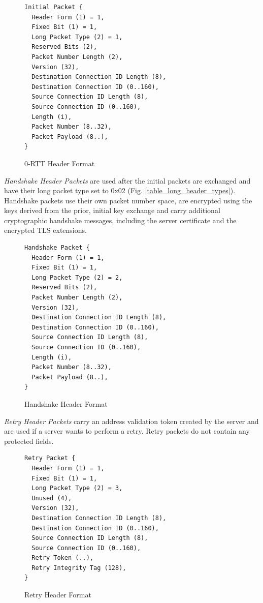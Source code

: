 \begin{figure}[htb]
    \centering      
\begin{verbatim}
Initial Packet {
  Header Form (1) = 1,
  Fixed Bit (1) = 1,
  Long Packet Type (2) = 1,
  Reserved Bits (2),
  Packet Number Length (2),
  Version (32),
  Destination Connection ID Length (8),
  Destination Connection ID (0..160),
  Source Connection ID Length (8),
  Source Connection ID (0..160),
  Length (i),
  Packet Number (8..32),
  Packet Payload (8..),
}
\end{verbatim}
    \caption{0-RTT Header Format\cite[94]{rfc9000}}
\end{figure}

\textit{Handshake Header Packets} are used after the initial packets are exchanged and have their long packet type set to 0x02 (Fig. \ref{table_long_header_types}). Handshake packets use their own packet number space, are encrypted using the keys derived from the prior, initial key exchange and carry additional cryptographic handshake messages, including the server certificate and the encrypted TLS extensions\cite{rfc9001}.

\begin{figure}[htb]
    \centering      
\begin{verbatim}
Handshake Packet {
  Header Form (1) = 1,
  Fixed Bit (1) = 1,
  Long Packet Type (2) = 2,
  Reserved Bits (2),
  Packet Number Length (2),
  Version (32),
  Destination Connection ID Length (8),
  Destination Connection ID (0..160),
  Source Connection ID Length (8),
  Source Connection ID (0..160),
  Length (i),
  Packet Number (8..32),
  Packet Payload (8..),
}
\end{verbatim}
    \caption{Handshake Header Format\cite[95]{rfc9000}} 
\end{figure}

\textit{Retry Header Packets} carry an address validation token created by the server and are used if a server wants to perform a retry. Retry packets do not contain any protected fields.

\begin{figure}[htb]
    \centering      
\begin{verbatim}
Retry Packet {
  Header Form (1) = 1,
  Fixed Bit (1) = 1,
  Long Packet Type (2) = 3,
  Unused (4),
  Version (32),
  Destination Connection ID Length (8),
  Destination Connection ID (0..160),
  Source Connection ID Length (8),
  Source Connection ID (0..160),
  Retry Token (..),
  Retry Integrity Tag (128),
}
\end{verbatim}
    \caption{Retry Header Format\cite[96]{rfc9000}} 
\end{figure}

